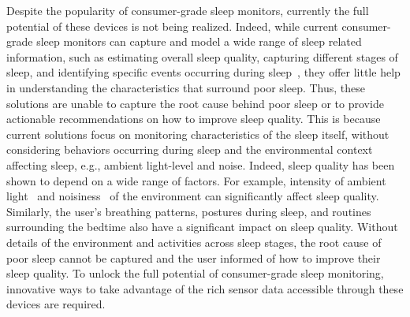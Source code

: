 Despite the popularity of consumer-grade sleep monitors, currently the full potential of these devices is not being realized. Indeed, while current consumer-grade sleep monitors can capture and model a wide range of sleep related information, such as estimating overall sleep quality, capturing different stages of sleep, and identifying specific events occurring during
sleep~\cite{kay2012lullaby,zhang2013real,sleepmonitor}, they offer little help in understanding the characteristics that surround poor sleep. Thus, these solutions are unable to capture the root cause behind poor sleep or to provide {actionable} recommendations on how to improve sleep quality. This is because current solutions focus on monitoring characteristics of the sleep itself, without considering behaviors occurring during sleep and the environmental context affecting sleep, e.g., ambient light-level and noise. Indeed, sleep quality has been shown to depend on a wide range of factors. For example, intensity of ambient light~\cite{hood04determinants} and noisiness~\cite{muzet2007environmental} of the environment can significantly affect sleep quality. Similarly, the user's breathing patterns, postures during sleep, and routines surrounding the bedtime also have a significant impact on sleep quality. Without details of the environment and activities across sleep stages, the root cause of poor sleep cannot be captured and the user informed of how to improve their sleep quality. To unlock the full potential of consumer-grade sleep monitoring, innovative ways to take advantage of the rich sensor data accessible through these devices are required.

